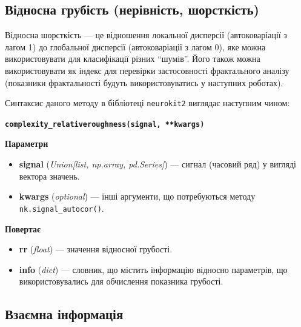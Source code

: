 \documentclass[
  letterpaper,
]{report}
\providecommand{\tightlist}{%
  \setlength{\itemsep}{0pt}\setlength{\parskip}{0pt}}\usepackage{longtable,booktabs,array}
\begin{document}
\hypertarget{ux432ux456ux434ux43dux43eux441ux43dux430-ux433ux440ux443ux431ux456ux441ux442ux44c-ux43dux435ux440ux456ux432ux43dux456ux441ux442ux44c-ux448ux43eux440ux441ux442ux43aux456ux441ux442ux44c}{%
\subsection{Відносна грубість (нерівність,
шорсткість)}\label{ux432ux456ux434ux43dux43eux441ux43dux430-ux433ux440ux443ux431ux456ux441ux442ux44c-ux43dux435ux440ux456ux432ux43dux456ux441ux442ux44c-ux448ux43eux440ux441ux442ux43aux456ux441ux442ux44c}}

Відносна шорсткість --- це відношення локальної дисперсії
(автоковаріації з лагом 1) до глобальної дисперсії (автоковаріації з
лагом 0), яке можна використовувати для класифікації різних ``шумів''.
Його також можна використовувати як індекс для перевірки застосовності
фрактального аналізу (показники фрактальності будуть використовуватись у
наступних роботах).

Синтаксис даного методу в бібліотеці \texttt{neurokit2} виглядає
наступним чином:

\textbf{\texttt{complexity\_relativeroughness(signal,\ **kwargs)}}

\textbf{Параметри}

\begin{itemize}
\tightlist
\item
  \textbf{signal} (\emph{Union{[}list, np.array, pd.Series{]}}) ---
  сигнал (часовий ряд) у вигляді вектора значень.
\item
  \textbf{kwargs} (\emph{optional}) --- інші аргументи, що потребуються
  методу \texttt{nk.signal\_autocor()}.
\end{itemize}

\textbf{Повертає}

\begin{itemize}
\tightlist
\item
  \textbf{rr} (\emph{float}) --- значення відносної грубості.
\item
  \textbf{info} (\emph{dict}) --- словник, що містить інформацію
  відносно параметрів, що використовувались для обчислення показника
  грубості.
\end{itemize}

\hypertarget{ux432ux437ux430ux454ux43cux43dux430-ux456ux43dux444ux43eux440ux43cux430ux446ux456ux44f}{%
\subsection{Взаємна
інформація}\label{ux432ux437ux430ux454ux43cux43dux430-ux456ux43dux444ux43eux440ux43cux430ux446ux456ux44f}}
\end{document}
